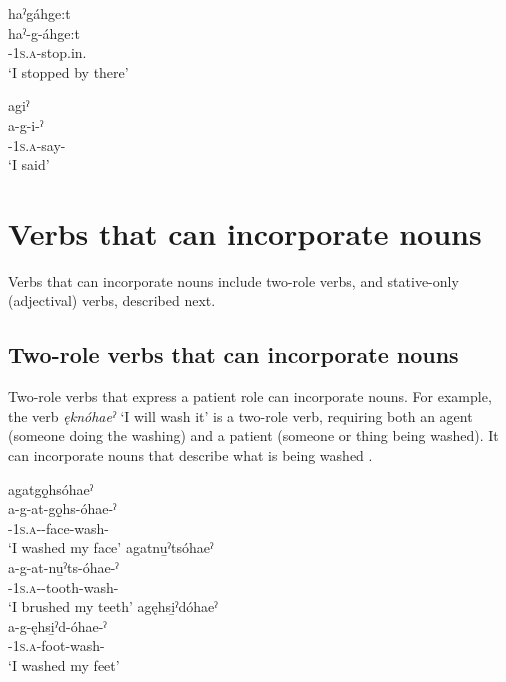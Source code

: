 \ex haˀgáhge:t\\
\gll haˀ-g-áhge:t\\
 {\translocative}-\textsc{1s.a}-stop.in.{\zeropunctual}\\
\glt `I stopped by there'

\ex agiˀ\\
\gll a-g-i-ˀ\\
 {\factual}-\textsc{1s.a}-say-{\punctual}\\
\glt `I said'
\z
\z



\section{Verbs that can incorporate nouns} \label{ch:Verbs that can incorporate nouns}
Verbs that can incorporate nouns include two-role verbs, and stative-only (adjectival) verbs, described next.

\subsection{Two-role verbs that can incorporate nouns} \label{ch:Two-role verbs that can incorporate nouns}
Two-role verbs that express a patient role can incorporate nouns. For example, the verb \textit{ęknóhaeˀ} ‘I will wash it’ is a two-role verb, requiring both an agent (someone doing the washing) and a patient (someone or thing being washed). It can incorporate nouns that describe what is being washed .
 
\ea\label{ex:incverbex}
\ea agatgǫ̱hsóhaeˀ\\
\gll a-g-at-gǫ̱hs-óhae-ˀ\\
 {\factual}-\textsc{1s.a}-{\semireflexive}-face-wash-{\punctual}\\
\glt `I washed my face'
\ex agatnu̱ˀtsóhaeˀ\\
\gll a-g-at-nu̱ˀts-óhae-ˀ\\
 {\factual}-\textsc{1s.a}-{\semireflexive}-tooth-wash-{\punctual}\\
\glt `I brushed my teeth'
 \clearpage
\ex agęhsi̱ˀdóhaeˀ\\
\gll a-g-ęhsi̱ˀd-óhae-ˀ\\
 {\factual}-\textsc{1s.a}-foot-wash-{\punctual}\\
\glt `I washed my feet'
\z
\z

